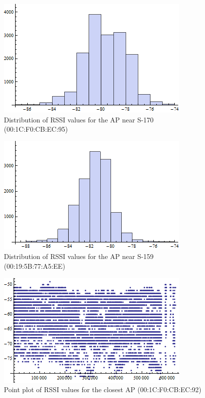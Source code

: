 \begin{figure}\centering
    \includegraphics{figures/histogram_00_1C_F0_CB_EC_95.png}
    \caption{Distribution of RSSI values for the AP near S-170 (00:1C:F0:CB:EC:95) \label{fig:histogram_00_1C_F0_CB_EC_95}}
\end{figure}

\begin{figure}\centering
    \includegraphics{figures/histogram_00_19_5B_77_A5_EE.png}
    \caption{Distribution of RSSI values for the AP near S-159 (00:19:5B:77:A5:EE) \label{fig:histogram_00_19_5B_77_A5_EE}}
\end{figure}

\begin{figure}\centering
    \includegraphics{figures/listplot_00_1C_F0_CB_EC_92.png}
    \caption{Point plot of RSSI values for the closest AP (00:1C:F0:CB:EC:92) \label{fig:listplot_00_1C_F0_CB_EC_92}}    
\end{figure}

